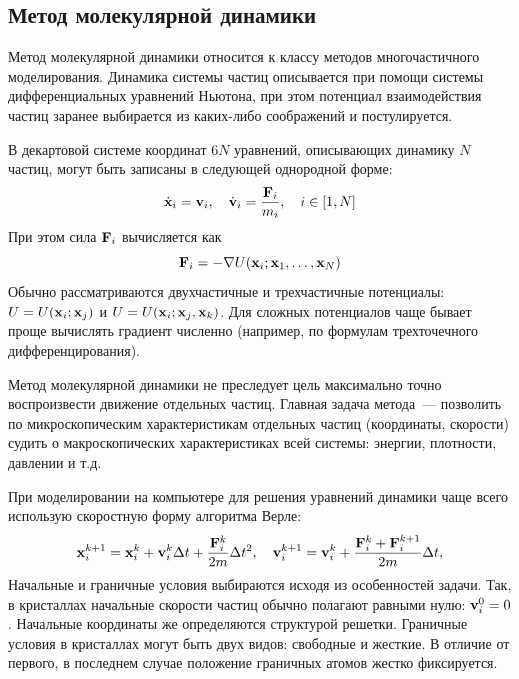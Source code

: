 \documentclass[12pt,a4paper]{article}
\begin{document}
        \subsection{Метод молекулярной динамики}

            Метод молекулярной динамики относится к классу методов многочастичного моделирования. Динамика системы частиц описывается при помощи системы дифференциальных уравнений Ньютона, при этом потенциал взаимодействия частиц заранее выбирается из каких-либо соображений и постулируется.

            В декартовой системе координат $6N$ уравнений, описывающих динамику $N$ частиц, могут быть записаны в следующей однородной форме:
            \begin{equation*}
                \dot{\vb{x}}_i = \vb{v}_i, \quad
                \dot{\vb{v}}_i = \frac{\vb{F}_i}{m_i} , \quad
                i \in [1,N]
            \end{equation*}
            При этом сила $\vb{F}_i$ вычисляется как
            \begin{equation*}
                \vb{F}_i = - \nabla U(\vb{x}_i;\vb{x}_1,\dots,\vb{x}_N)
            \end{equation*}
            Обычно рассматриваются двухчастичные и трехчастичные потенциалы: $U=U(\vb{x}_i;\vb{x}_j)$ и $U=U(\vb{x}_i;\vb{x}_j,\vb{x}_k)$. Для сложных потенциалов чаще бывает проще вычислять градиент численно (например, по формулам трехточечного дифференцирования).

            Метод молекулярной динамики не преследует цель максимально точно воспроизвести движение отдельных частиц. Главная задача метода~--- позволить по микроскопическим характеристикам отдельных частиц (координаты, скорости) судить о макроскопических характеристиках всей системы: энергии, плотности, давлении и т.д.

            При моделировании на компьютере для решения уравнений динамики чаще всего использую скоростную форму алгоритма Верле:
            \begin{equation*}
                \vb{x}_i^{k+1} = \vb{x}_i^k + \vb{v}_i^k \Delta t + \frac{\vb{F}_i^k}{2m} \Delta t^2, \quad
                \vb{v}_i^{k+1} = \vb{v}_i^k + \frac{\vb{F}_i^k + \vb{F}_i^{k+1}}{2m} \Delta t,
            \end{equation*}
            Начальные и граничные условия выбираются исходя из особенностей задачи. Так, в кристаллах начальные скорости частиц обычно полагают равными нулю: $\vb{v}_i^0 = 0$. Начальные координаты же определяются структурой решетки. Граничные условия в кристаллах могут быть двух видов: свободные и жесткие. В отличие от первого, в последнем случае положение граничных атомов жестко фиксируется.
\end{document}
